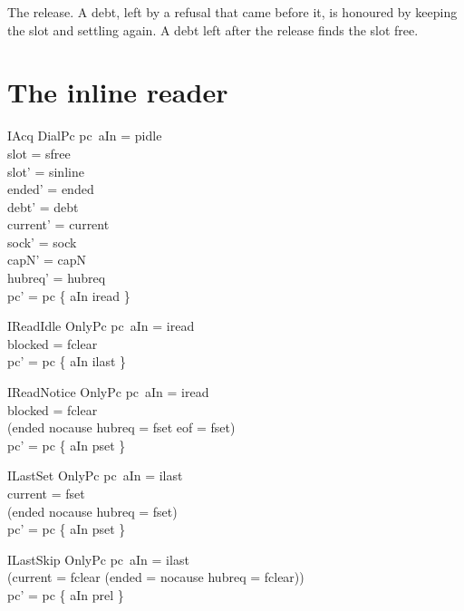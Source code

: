 \documentclass[a4paper,10pt,fleqn]{article}
\begin{document}
The release.  A debt, left by a refusal that came before it, is honoured by
keeping the slot and settling again.  A debt left after the release finds the
slot free.

\section{The inline reader}

\begin{schema}{IAcq}
  DialPc
\where
  pc~aIn = pidle \\
  slot = sfree \\
  slot' = sinline \\
  ended' = ended \\
  debt' = debt \\
  current' = current \\
  sock' = sock \\
  capN' = capN \\
  hubreq' = hubreq \\
  pc' = pc \oplus \{ aIn \mapsto iread \}
\end{schema}

\begin{schema}{IReadIdle}
  OnlyPc
\where
  pc~aIn = iread \\
  blocked = fclear \\
  pc' = pc \oplus \{ aIn \mapsto ilast \}
\end{schema}

\begin{schema}{IReadNotice}
  OnlyPc
\where
  pc~aIn = iread \\
  blocked = fclear \\
  (ended \neq nocause \lor hubreq = fset \lor eof = fset) \\
  pc' = pc \oplus \{ aIn \mapsto pset \}
\end{schema}

\begin{schema}{ILastSet}
  OnlyPc
\where
  pc~aIn = ilast \\
  current = fset \\
  (ended \neq nocause \lor hubreq = fset) \\
  pc' = pc \oplus \{ aIn \mapsto pset \}
\end{schema}

\begin{schema}{ILastSkip}
  OnlyPc
\where
  pc~aIn = ilast \\
  (current = fclear \lor (ended = nocause \land hubreq = fclear)) \\
  pc' = pc \oplus \{ aIn \mapsto prel \}
\end{schema}
\end{document}
